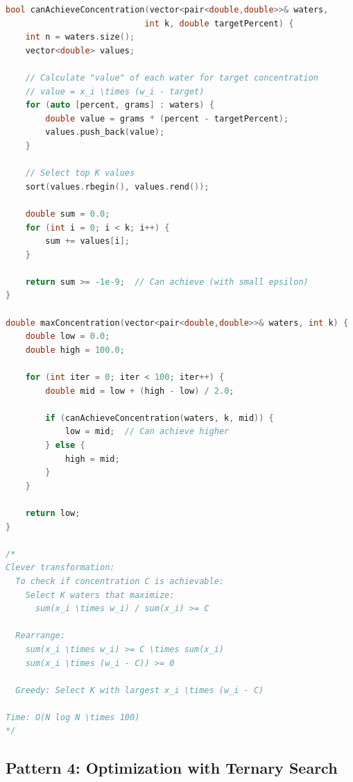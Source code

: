 \documentclass[11pt,a4paper,oneside]{book}
\begin{document}
\begin{lstlisting}[language=C++, caption=Complete Equation Solving Solutions - NEW PROBLEM]
bool canAchieveConcentration(vector<pair<double,double>>& waters, 
                            int k, double targetPercent) {
    int n = waters.size();
    vector<double> values;
    
    // Calculate "value" of each water for target concentration
    // value = x_i \times (w_i - target)
    for (auto [percent, grams] : waters) {
        double value = grams * (percent - targetPercent);
        values.push_back(value);
    }
    
    // Select top K values
    sort(values.rbegin(), values.rend());
    
    double sum = 0.0;
    for (int i = 0; i < k; i++) {
        sum += values[i];
    }
    
    return sum >= -1e-9;  // Can achieve (with small epsilon)
}

double maxConcentration(vector<pair<double,double>>& waters, int k) {
    double low = 0.0;
    double high = 100.0;
    
    for (int iter = 0; iter < 100; iter++) {
        double mid = low + (high - low) / 2.0;
        
        if (canAchieveConcentration(waters, k, mid)) {
            low = mid;  // Can achieve higher
        } else {
            high = mid;
        }
    }
    
    return low;
}

/*
Clever transformation:
  To check if concentration C is achievable:
    Select K waters that maximize:
      sum(x_i \times w_i) / sum(x_i) >= C
  
  Rearrange:
    sum(x_i \times w_i) >= C \times sum(x_i)
    sum(x_i \times (w_i - C)) >= 0
  
  Greedy: Select K with largest x_i \times (w_i - C)

Time: O(N log N \times 100)
*/
\end{lstlisting}

\subsection{Pattern 4: Optimization with Ternary Search}
\end{document}
